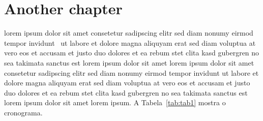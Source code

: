\chapter*{Another chapter}
\label{chap:chap2}

lorem ipsum dolor sit amet consetetur sadipscing elitr sed diam
nonumy eirmod tempor invidunt~\cite{PLASSPAG81} ut labore et
dolore magna aliquyam erat sed diam voluptua at vero eos et
accusam et justo duo dolores et ea rebum stet clita kasd gubergren
no sea takimata sanctus est lorem ipsum dolor sit amet lorem ipsum
dolor sit amet consetetur sadipscing elitr sed diam nonumy eirmod
tempor invidunt ut labore et dolore magna aliquyam erat sed diam
voluptua at vero eos et accusam et justo duo dolores et ea rebum
stet clita kasd gubergren no sea takimata sanctus est lorem ipsum
dolor sit amet lorem ipsum. A Tabela~\ref{tab:tab1} mostra o
cronograma.~\cite{WIKIPIC09}

\begin{table}[htb]
\begin{center}
\caption{\label{tab:tab1}This is a table}%
\setlength{\tabcolsep}{.5cm}%
\end{center}
\end{table}

